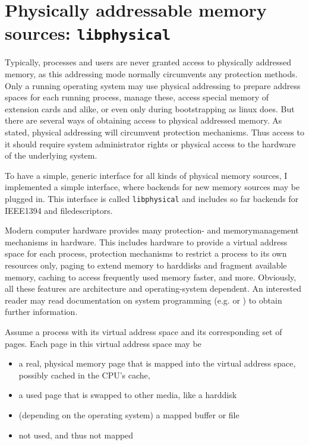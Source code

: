 %
%

\section{Physically addressable memory sources: \texttt{libphysical}}

Typically, processes and users are never granted access to physically addressed
memory, as this addressing mode normally circumvents any protection methods.
Only a running operating system may use physical addressing to prepare address
spaces for each running process, manage these, access special memory of
extension cards and alike, or even only during bootstrapping as linux does. But
there are several ways of obtaining access to physical addressed memory. As
stated, physical addressing will circumvent protection mechanisms. Thus access
to it should require system administrator rights or physical access to the
hardware of the underlying system.

To have a simple, generic interface for all kinds of physical memory sources, I
implemented a simple interface, where backends for new memory sources may be
plugged in. This interface is called \texttt{libphysical} and includes so far
backends for IEEE1394 and filedescriptors.

Modern computer hardware provides many protection- and memorymanagement
mechanisms in hardware. This includes hardware to provide a virtual address
space for each process, protection mechanisms to restrict a process to its own
resources only, paging to extend memory to harddisks and fragment available
memory, caching to access frequently used memory faster, and more. Obviously,
all these features are architecture and operating-system dependent. An
interested reader may read documentation on system programming (e.g.
\cite{rwth_syspro_scriptum:2002} or \cite{IA32_SDM_3a:2006,IA32_SDM_3b:2006}) to
obtain further information.

Assume a process with its virtual address space and its corresponding set of
pages. Each page in this virtual address space may be

\begin{itemize}

	\item a real, physical memory page that is mapped into the virtual 
		address space, possibly cached in the CPU's cache,

	\item a used page that is swapped to other media, like a harddisk

	\item (depending on the operating system) a mapped buffer or file

	\item not used, and thus not mapped

\end{itemize}

